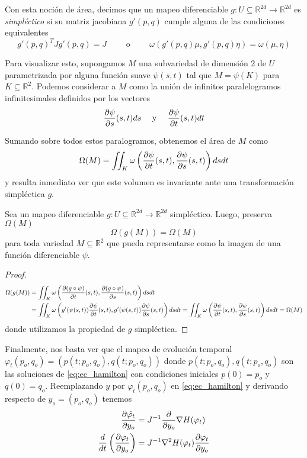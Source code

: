 Con esta noción de área, decimos que un mapeo diferenciable $g:U\subseteq\mathbb{R}^{2d}\to\mathbb{R}^{2d}$ es \textit{simpléctico} si su matriz jacobiana $g'(p,q)$ cumple alguna de las condiciones
equivalentes \[ g'(p,q)^T J g'(p,q) = J \qquad \text{ o } \qquad \omega(g'(p,q)\mu, g'(p,q)\eta) = \omega(\mu, \eta) \]

Para visualizar esto, supongamos $M$ una subvariedad de dimensión 2 de $U$ parametrizada por alguna función suave $\psi(s,t)$ tal que $M=\psi(K)$ para $K\subseteq\mathbb{R}^2$.
Podemos considerar a $M$ como la unión de infinitos paralelogramos infinitesimales definidos por los vectores
\[ \frac{\partial\psi}{\partial s}(s,t)ds \quad \text{ y } \quad \frac{\partial\psi}{\partial t}(s,t)dt \]

Sumando sobre todos estos paralogramos, obtenemos el área de $M$ como
\begin{equation}{\label{eq:area_orien_simp}}
 \Omega(M) = \iint_K \omega\left(\frac{\partial\psi}{\partial t}(s,t), \frac{\partial\psi}{\partial s}(s,t)\right) ds dt
\end{equation}
y resulta inmediato ver que este volumen es invariante ante una transformación simpléctica $g$.

\begin{theorem}{\label{teo:preservacion_vol}}
 Sea un mapeo diferenciable $g:U\subseteq\mathbb{R}^{2d}\to\mathbb{R}^{2d}$ simpléctico. Luego, preserva $\Omega(M)$
 \[ \Omega(g(M)) = \Omega(M) \]
 para toda variedad $M\subseteq\mathbb{R}^2$ que pueda representarse como la imagen de una función diferenciable $\psi$.
\end{theorem}
\begin{proof}
\begin{align*}
 \Omega(g(M)) &=  \iint_K \omega\left(\frac{\partial(g\circ\psi)}{\partial t}(s,t), \frac{\partial(g\circ\psi)}{\partial s}(s,t)\right) ds dt \\
&= \iint_K \omega\left(g'(\psi(s,t))\frac{\partial\psi}{\partial t}(s,t), g'(\psi(s,t))\frac{\partial\psi}{\partial s}(s,t)\right) ds dt = \iint_K \omega\left(\frac{\partial\psi}{\partial t}(s,t), \frac{\partial\psi}{\partial s}(s,t)\right) ds dt = \Omega(M)
\end{align*}
donde utilizamos la propiedad de $g$ simpléctica.
\end{proof}

Finalmente, nos basta ver que el mapeo de evolución temporal $\varphi_t(p_o,q_o) = (p(t;p_o,q_o), q(t;p_o,q_o))$ donde $p(t;p_o,q_o), q(t;p_o,q_o)$ son las soluciones de \eqref{eq:ec_hamilton}
con condiciones iniciales $p(0)=p_o$ y $q(0)=q_o$.
Reemplazando $y$ por $\varphi_t(p_o,q_o)$ en \eqref{eq:ec_hamilton} y derivando respecto de $y_o=(p_o,q_o)$ tenemos
\begin{align*}
 \frac{\partial\dot{\varphi_t}}{\partial y_o} &= J^{-1}\frac{\partial}{\partial y_o} \nabla H(\varphi_t) \\
 \frac{d}{dt}\left(\frac{\partial\varphi_t}{\partial y_o}\right) &= J^{-1} \nabla^2 H(\varphi_t)\frac{\partial\varphi_t}{\partial y_o}
\end{align*}

